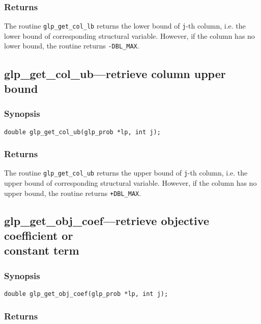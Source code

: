 \subsubsection*{Returns}

The routine \verb|glp_get_col_lb| returns the lower bound of
\verb|j|-th column, i.e. the lower bound of corresponding structural
variable. However, if the column has no lower bound, the routine returns
\verb|-DBL_MAX|.

\subsection{glp\_get\_col\_ub---retrieve column upper bound}

\subsubsection*{Synopsis}

\begin{verbatim}
double glp_get_col_ub(glp_prob *lp, int j);
\end{verbatim}

\subsubsection*{Returns}

The routine \verb|glp_get_col_ub| returns the upper bound of
\verb|j|-th column, i.e. the upper bound of corresponding structural
variable. However, if the column has no upper bound, the routine returns
\verb|+DBL_MAX|.

\subsection{glp\_get\_obj\_coef---retrieve objective coefficient or\\
constant term}

\subsubsection*{Synopsis}

\begin{verbatim}
double glp_get_obj_coef(glp_prob *lp, int j);
\end{verbatim}

\subsubsection*{Returns}

